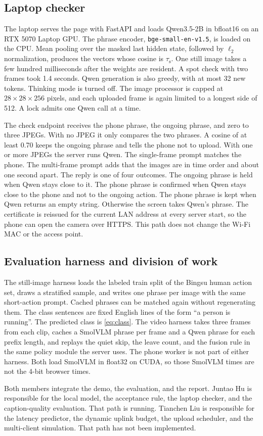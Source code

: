 \subsection{Laptop checker}

The laptop serves the page with FastAPI and loads Qwen3.5-2B in bfloat16 on
an RTX 5070 Laptop GPU. The phrase encoder,
\texttt{bge-small-en-v1.5}, is loaded on the CPU. Mean pooling over the
masked last hidden state, followed by $\ell_2$ normalization, produces the
vectors whose cosine is $\tau_{\mathrm{s}}$. One still image takes a few
hundred milliseconds after the weights are resident. A spot check with two
frames took 1.4 seconds. Qwen generation is also greedy, with at most 32
new tokens. Thinking mode is turned off. The image processor is capped at
$28\times 28\times 256$ pixels, and each uploaded frame is again limited to
a longest side of 512. A lock admits one Qwen call at a time.

The check endpoint receives the phone phrase, the ongoing phrase, and zero
to three JPEGs. With no JPEG it only compares the two phrases. A cosine of
at least 0.70 keeps the ongoing phrase and tells the phone not to upload.
With one or more JPEGs the server runs Qwen. The single-frame prompt
matches the phone. The multi-frame prompt adds that the images are in time
order and about one second apart. The reply is one of four outcomes. The
ongoing phrase is held when Qwen stays close to it. The phone phrase is
confirmed when Qwen stays close to the phone and not to the ongoing action.
The phone phrase is kept when Qwen returns an empty string. Otherwise the
screen takes Qwen's phrase. The certificate is reissued for the current
LAN address at every server start, so the phone can open the camera over
HTTPS. This path does not change the Wi-Fi MAC or the access point.

\subsection{Evaluation harness and division of work}

The still-image harness loads the labeled train split of the Bingsu human
action set, draws a stratified sample, and writes one phrase per image with
the same short-action prompt. Cached phrases can be matched again without
regenerating them. The class sentences are fixed English lines of the form
``a person is running''. The predicted class is \eqref{eq:class}. The video
harness takes three frames from each clip, caches a SmolVLM phrase per
frame and a Qwen phrase for each prefix length, and replays the quiet skip,
the leave count, and the fusion rule in the same policy module the server
uses. The phone worker is not part of either harness. Both load SmolVLM in
float32 on CUDA, so those SmolVLM times are not the 4-bit browser times.

Both members integrate the demo, the evaluation, and the report. Juntao Hu
is responsible for the local model, the acceptance rule, the laptop
checker, and the caption-quality evaluation. That path is running. Tianchen
Liu is responsible for the latency predictor, the dynamic uplink budget,
the upload scheduler, and the multi-client simulation. That path has not
been implemented.
